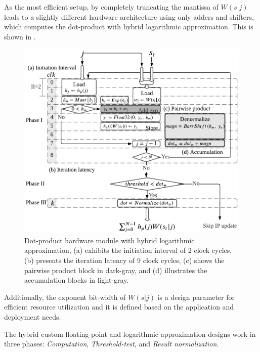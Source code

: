  As the most efficient setup, by completely truncating the mantissa of $W(s|j)$ leads to a slightly different hardware architecture using only adders and shifters, which computes the dot-product with hybrid logarithmic approximation. This is shown in .
 
  \begin{figure}
 	\centering
 	\includegraphics[width=0.5\columnwidth]{./chapters/sbs_accelerator/figures/dot_product_log.pdf}
 	\caption{Dot-product hardware module with hybrid logarithmic approximation, (a) exhibits the initiation interval of 2 clock cycles, (b) presents the iteration latency of 9 clock cycles, (c) shows the pairwise product block in dark-gray, and (d) illustrates the accumulation blocks in light-gray.}
 	\label{fig:dot_product_log}
 \end{figure}
 
Additionally, the exponent bit-width of $W(s|j)$ is a design parameter for efficient resource utilization and it is defined based on the application and deployment needs.
 
 The hybrid custom floating-point and logarithmic approximation designs work in three phases: \emph{Computation}, \emph{Threshold-test}, and \emph{Result normalization}.
 
